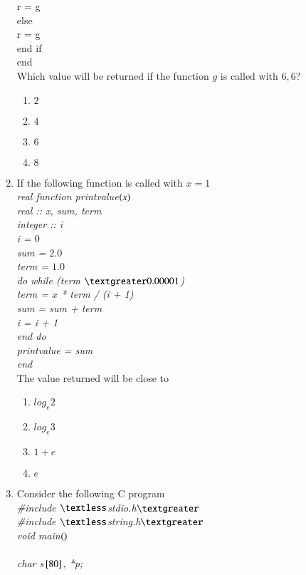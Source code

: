 \documentclass[journal]{IEEEtran}
\begin{document}
\begin{enumerate}
{{        r = g\\
    else\\
        r = g\\
    end if\\
end\\}
Which value will be returned if the function $g$ is called with $6,6$?
\begin{enumerate}
\item $2$
\item $4$
\item $6$
\item $8$
\end{enumerate}
}
\item{
If the following function is called with $x=1$\\
\textit{
real function print\textunderscore value$\left(x\right)$\\
    real :: x, sum, term\\
    integer :: i\\
    i = $0$\\
    sum = $2.0$\\
    term = $1.0$\\
    do while (term $\textgreater 0.00001$)\\
        term = $x$ * term / (i + 1)\\
        sum = sum + term\\
        i = i + 1\\
    end do\\
    print\textunderscore value = sum\\
end\\
}
The value returned will be close to
\begin{multicols}{4}
\begin{enumerate}
\item $log_e2$
\item $log_e3$
\item $1+e$
\item $e$
\end{enumerate}
\end{multicols}
}
\item{
Consider the following C program\\
\textit{
\#include $\textless$stdio.h$\textgreater$\\
\#include $\textless$string.h$\textgreater$\\
void main$\left(\right)$\\
{\\
    char s${}\left[80\right]$, *p;\\
}}}
\end{enumerate}
\end{document}
